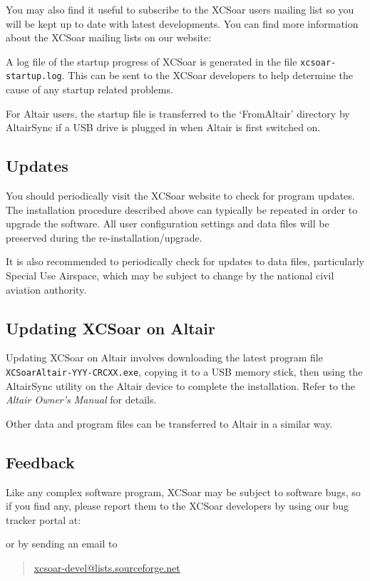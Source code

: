 You may also find it useful to subscribe to the XCSoar users mailing
list so you will be kept up to date with latest developments. You can find more
information about the XCSoar mailing lists on our website:
\begin{quote}
\end{quote}

A log file of the startup progress of XCSoar is generated in the file
\verb|xcsoar-startup.log|. This can be sent to the XCSoar developers
to help determine the cause of any startup related problems.

For Altair users, the startup file is transferred to the `FromAltair'
directory by AltairSync if a USB drive is plugged in when Altair is
first switched on.

\subsection*{Updates}
You should periodically visit the XCSoar website to check for program
updates. The installation procedure described above can typically be
repeated in order to upgrade the software.  All user configuration
settings and data files will be preserved during the
re-installation/upgrade.

It is also recommended to periodically check for updates to data
files, particularly Special Use Airspace, which may be subject to
change by the national civil aviation authority.

\subsection*{Updating XCSoar on Altair}
Updating XCSoar on Altair involves downloading the latest program file
{\tt XCSoarAltair-YYY-CRCXX.exe}, copying it to a USB memory stick,
then using the AltairSync utility on the Altair device to complete the
installation.  Refer to the {\em Altair Owner's Manual} for details.

Other data and program files can be transferred to Altair in a similar
way.

\subsection*{Feedback}
Like any complex software program, XCSoar may be subject to software
bugs, so if you find any, please report them to the XCSoar developers
by using our bug tracker portal at: 
\begin{quote}
\end{quote}
or by sending an email to
\begin{quote}
\href{mailto:xcsoar-devel@lists.sourceforge.net}{xcsoar-devel@lists.sourceforge.net}
\end{quote}

